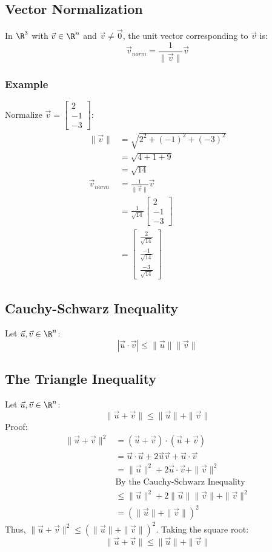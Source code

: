 \documentclass[letterpaper, 12pt]{math}
\begin{document}
\subsection*{Vector Normalization}
In \( \R^3 \) with \( \vec{v}\in\R^{n} \) and \( \vec{v}\neq\vec{0} \), the
unit vector corresponding to \( \vec{v} \) is:
\[ \vec{v}_{norm} = \frac{1}{\|\vec{v}\|}\vec{v} \]

\subsubsection*{Example}
Normalize \( \vec{v} = \begin{bmatrix}2 \\ -1 \\ -3\end{bmatrix} \):
\begin{align*}
  \|\vec{v}\| &= \sqrt{2^2+(-1)^2+(-3)^2} \\
  &= \sqrt{4+1+9} \\
  &= \sqrt{14} \\
  \vec{v}_{norm} &= \frac{1}{\|\vec{v}\|}\vec{v} \\
  &= \frac{1}{\sqrt{14}}\begin{bmatrix}2 \\ -1 \\ -3\end{bmatrix} \\
  &= \begin{bmatrix}
    \frac{2}{\sqrt{14}} \\
    \frac{-1}{\sqrt{14}} \\
    \frac{-3}{\sqrt{14}}
  \end{bmatrix}
\end{align*}

\subsection*{Cauchy-Schwarz Inequality}
Let \( \vec{u},\vec{v}\in\R^{n} \):
\[ |\vec{u}\cdot\vec{v}|\leq\|\vec{u}\|\|\vec{v}\| \]

\subsection*{The Triangle Inequality}
Let \( \vec{u},\vec{v}\in\R^{n} \):
\[ \|\vec{u}+\vec{v}\|\leq\|\vec{u}\|+\|\vec{v}\| \]
Proof:
\begin{align*}
  \|\vec{u}+\vec{v}\|^2 &= (\vec{u}+\vec{v})\cdot(\vec{u}+\vec{v}) \\
  &= \vec{u}\cdot\vec{u}+2\vec{u}\vec{v}+\vec{u}\cdot\vec{v} \\
  &= \|\vec{u}\|^2+2\vec{u}\cdot\vec{v}+\|\vec{v}\|^2 \\
  & \textrm{By the Cauchy-Schwarz Inequality} \\
  &\leq \|\vec{u}\|^2+2\|\vec{u}\|\|\vec{v}\|+\|\vec{v}\|^2 \\
  &= (\|\vec{u}\|+\|\vec{v}\|)^2
\end{align*}
Thus, \( \|\vec{u}+\vec{v}\|^2 \leq (\|\vec{u}\|+\|\vec{v}\|)^2 \). Taking the
square root:
\[ \|\vec{u}+\vec{v}\|\leq\|\vec{u}\|+\|\vec{v}\| \]
\end{document}
